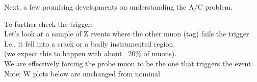 \begin{frame}[label=INTERESTING]
Next, a few promising developments on understanding the A/C problem.
\end{frame}

 {
To further check the trigger: \\
Let's look at a sample of Z events where the other muon (tag) fails the trigger \\
I.e., it fell into a crack or a badly instrumented region. \\
(we expect this to happen with about ~20\% of muons). \\
We are effectively forcing the probe muon to be the one that triggers the event. \\
\small{ Note: W plots below are unchanged from nominal }
}

